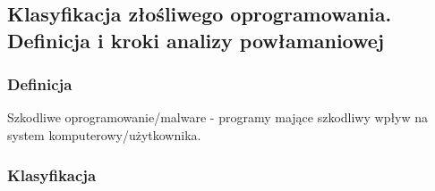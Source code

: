 \subsection{Klasyfikacja złośliwego oprogramowania. Definicja i kroki analizy powłamaniowej}

\subsubsection{Definicja}

Szkodliwe oprogramowanie/malware - programy mające szkodliwy wpływ na system komputerowy/użytkownika. \\

\subsubsection{Klasyfikacja}

